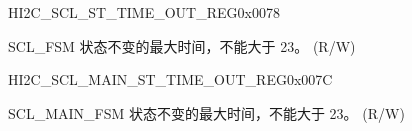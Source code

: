 \begin{register}{H}{I2C\_SCL\_ST\_TIME\_OUT\_REG}{0x0078}\label{regdesc:I2CSCLSTTIMEOUTREG}
%
%
\regnewline%
\begin{regdesc}\begin{reglist}
\label{fielddesc:I2CSCLSTTOI2C}\item [I2C\_SCL\_ST\_TO\_I2C] SCL\_FSM 状态不变的最大时间，不能大于 23。 (R/W)
\end{reglist}\end{regdesc}
\end{register}


\begin{register}{H}{I2C\_SCL\_MAIN\_ST\_TIME\_OUT\_REG}{0x007C}\label{regdesc:I2CSCLMAINSTTIMEOUTREG}
%
%
\regnewline%
\begin{regdesc}\begin{reglist}
\label{fielddesc:I2CSCLMAINSTTOI2C}\item [I2C\_SCL\_MAIN\_ST\_TO\_I2C] SCL\_MAIN\_FSM 状态不变的最大时间，不能大于 23。 (R/W)
\end{reglist}\end{regdesc}
\end{register}


